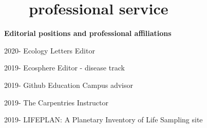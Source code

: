 \documentclass[]{CV}
\begin{document}









\section{ \faUserPlus \ \ \ professional service}

\textbf{Editorial positions and professional affiliations}

\begin{entrylist}
 
 \entry
	 {2020-}
	 {Ecology Letters}
	 {Editor}
	 
 \entry
	 {2019-}
	 {Ecosphere}
	 {Editor - disease track}

 \entry
	 {2019-}
	 {Github Education}
	 {Campus advisor}

 \entry
	 {2019-}
	 {The Carpentries}
	 {Instructor}

 \entry
	 {2019-}
	 {LIFEPLAN: A Planetary Inventory of Life}
	 {Sampling site}

\end{entrylist}
\end{document}
